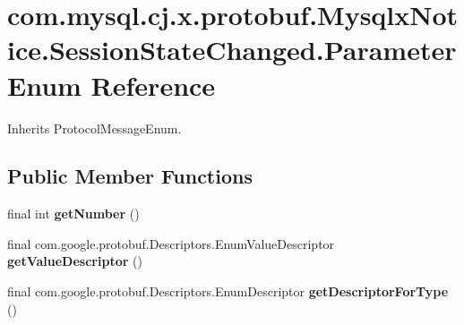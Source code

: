 \hypertarget{enumcom_1_1mysql_1_1cj_1_1x_1_1protobuf_1_1_mysqlx_notice_1_1_session_state_changed_1_1_parameter}{}\section{com.\+mysql.\+cj.\+x.\+protobuf.\+Mysqlx\+Notice.\+Session\+State\+Changed.\+Parameter Enum Reference}
\label{enumcom_1_1mysql_1_1cj_1_1x_1_1protobuf_1_1_mysqlx_notice_1_1_session_state_changed_1_1_parameter}


Inherits Protocol\+Message\+Enum.

\subsection*{Public Member Functions}
\begin{DoxyCompactItemize}
\item 
\mbox{\label{enumcom_1_1mysql_1_1cj_1_1x_1_1protobuf_1_1_mysqlx_notice_1_1_session_state_changed_1_1_parameter_ab410bac2c8fa55f1d894fc45624a0ab7}} 
final int {\bfseries get\+Number} ()
\item 
\mbox{\label{enumcom_1_1mysql_1_1cj_1_1x_1_1protobuf_1_1_mysqlx_notice_1_1_session_state_changed_1_1_parameter_a886925176f066724d13ef6a7a266818d}} 
final com.\+google.\+protobuf.\+Descriptors.\+Enum\+Value\+Descriptor {\bfseries get\+Value\+Descriptor} ()
\item 
\mbox{\label{enumcom_1_1mysql_1_1cj_1_1x_1_1protobuf_1_1_mysqlx_notice_1_1_session_state_changed_1_1_parameter_ad6bf0d91ff6f6fe843a5c9a5bdb72319}} 
final com.\+google.\+protobuf.\+Descriptors.\+Enum\+Descriptor {\bfseries get\+Descriptor\+For\+Type} ()
\end{DoxyCompactItemize}
